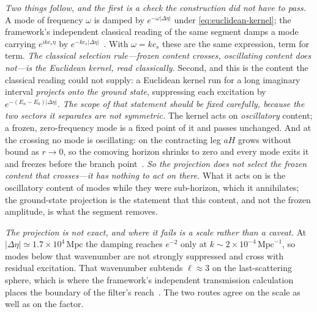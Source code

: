 \documentclass[11pt,a4paper]{article}
\theoremstyle{plain}
\theoremstyle{definition}
\theoremstyle{remark}
\begin{document}
\emph{Two things follow, and the first is a check the construction did not have to pass.} A mode of frequency
$\omega$ is damped by $e^{-\omega\lvert\Delta\eta\rvert}$ under \eqref{eq:euclidean-kernel}; the framework's
independent classical reading of the same segment damps a mode carrying $e^{ikc_s\eta}$ by
$e^{-kc_s\lvert\Delta\eta\rvert}$~\cite{JanzenCRframework}. With $\omega=kc_s$ these are the same expression,
term for term. \emph{The classical selection rule---frozen content crosses, oscillating content does
not---is the Euclidean kernel, read classically.} Second, and this is the content the classical reading could
not supply: a Euclidean kernel run for a long imaginary interval \emph{projects onto the ground state},
suppressing each excitation by $e^{-(E_n-E_0)\lvert\Delta\eta\rvert}$. \emph{The scope of that statement should be fixed carefully, because the two sectors it separates are not symmetric.} The kernel acts on \emph{oscillatory} content; a frozen, zero-frequency mode is a fixed point of it and passes unchanged. And at the crossing no mode is oscillating: on the contracting leg $aH$ grows without bound as $r\to0$, so the comoving horizon shrinks to zero and every mode exits it and freezes before the branch point~\cite{JanzenCRcosmology}. \emph{So the projection does not select the frozen content that crosses---it has nothing to act on there.} What it acts on is the oscillatory content of modes while they were sub-horizon, which it annihilates; the ground-state projection is the statement that this content, and not the frozen amplitude, is what the segment removes.

\emph{The projection is not exact, and where it fails is a scale rather than a caveat.} At
$\lvert\Delta\eta\rvert\simeq1.7\times10^{4}\,\mathrm{Mpc}$ the damping reaches $e^{-2}$ only at
$k\sim2\times10^{-4}\,\mathrm{Mpc}^{-1}$, so modes below that wavenumber are not strongly suppressed and cross
with residual excitation. That wavenumber subtends $\ell\approx3$ on the last-scattering sphere, which is
where the framework's independent transmission calculation places the boundary of the filter's
reach~\cite{JanzenCRframework}. The two routes agree on the scale as well as on the factor.
\end{document}
